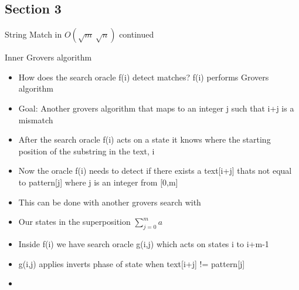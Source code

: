 \documentclass{beamer}
\begin{document}
\subsection{Section 3}
\begin{frame}{String Match in \(O(\sqrt{m}\ \sqrt{n})\) continued}
  \begin{block}{Inner Grovers algorithm}
    \begin{itemize}
      \item How does the search oracle f(i) detect matches? f(i) performs Grovers algorithm
      \item Goal: Another grovers algorithm that maps to an integer j such that i+j is a mismatch
      \item After the search oracle f(i) acts on a state it knows where the starting position of the substring in the text, i
      \item Now the oracle f(i) needs to detect if there exists a text[i+j] thats not equal to pattern[j] where j is an integer from [0,m]
      \item This can be done with another grovers search with
      \item Our states in the superposition $\sum_{j=0}^{m} a$
      \item Inside f(i) we have search oracle g(i,j) which acts on states i to i+m-1
      \item g(i,j) applies inverts phase of state when text[i+j] != pattern[j]
      \item
    \end{itemize}
  \end{block}
\end{frame}
\end{document}
